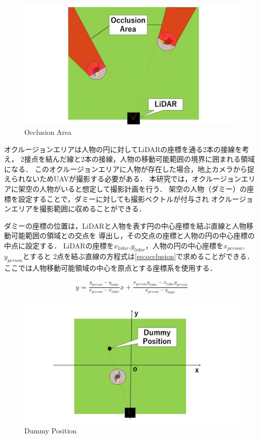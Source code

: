 \documentclass[autodetect-engine,dvipdfmx-if-dvi,ja=standard,a4j,jbase=11pt,magstyle=nomag*]{bxjsreport}
\begin{document}
\begin{figure}[t]
    \centering
    \includegraphics[width=\linewidth, clip]{./figure/chapter3/occlusion_area.png}
    \caption{Occlusion Area}
    \label{fig:occlusion_area}
\end{figure}

オクルージョンエリアは人物の円に対してLiDARの座標を通る2本の接線を考え，
2接点を結んだ線と2本の接線，人物の移動可能範囲の境界に囲まれる領域になる．
このオクルージョンエリアに人物が存在した場合，地上カメラから捉えられないためUAVが撮影する必要がある．
本研究では，オクルージョンエリアに架空の人物がいると想定して撮影計画を行う．
架空の人物（ダミー）の座標を設定することで，ダミーに対しても撮影ベクトルが付与され
オクルージョンエリアを撮影範囲に収めることができる．

ダミーの座標の位置は，LiDARと人物を表す円の中心座標を結ぶ直線と人物移動可能範囲の領域との交点を
導出し，その交点の座標と人物の円の中心座標の中点に設定する．
LiDARの座標を$x_{lidar}$,$y_{lidar}$，人物の円の中心座標を$x_{person}$,$y_{person}$とすると
2点を結ぶ直線の方程式は\cref{eq:occlusion}で求めることができる．
ここでは人物移動可能領域の中心を原点とする座標系を使用する．

\begin{equation}
    \begin{aligned}
       y = \frac{y_{person} - y_{lidar}}{x_{person} - x_{lidar}} x + 
\frac{x_{person}y_{lidar} - x_{lidar}y_{person}}{x_{person} - y_{lidar}}
    \end{aligned}
    \label{eq:occlusion}
\end{equation}

\begin{figure}[t]
    \centering
    \includegraphics[width=\linewidth, clip]{./figure/chapter3/dummy.png}
    \caption{Dummy Position}
    \label{fig:dummy}
\end{figure}
\end{document}
